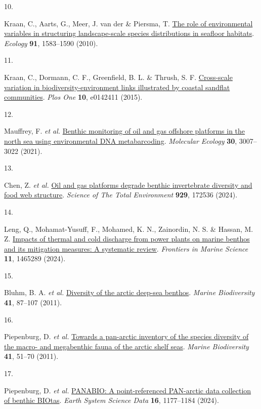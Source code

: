 \documentclass[
  letterpaper,
  DIV=11,
  numbers=noendperiod]{scrartcl}
\newlength{\cslhangindent}
\newlength{\csllabelwidth}
\newenvironment{CSLReferences}[2] %
 {\begin{list}{}{%
  \setlength{\itemindent}{0pt}
  \setlength{\leftmargin}{0pt}
  \setlength{\parsep}{0pt}
  \ifodd #1
   \setlength{\leftmargin}{\cslhangindent}
   \setlength{\itemindent}{-1\cslhangindent}
  \fi
  \setlength{\itemsep}{#2\baselineskip}}}
 {\end{list}}
\newcommand{\CSLLeftMargin}[1]{\parbox[t]{\csllabelwidth}{\strut#1\strut}}
\newcommand{\CSLRightInline}[1]{\parbox[t]{\linewidth - \csllabelwidth}{\strut#1\strut}}
\begin{document}
\begin{CSLReferences}{0}{0}
\CSLLeftMargin{10. }%
\CSLRightInline{Kraan, C., Aarts, G., Meer, J. van der \& Piersma, T.
\href{https://doi.org/10.1890/09-2040.1}{The role of environmental
variables in structuring landscape-scale species distributions in
seafloor habitats}. \emph{Ecology} \textbf{91}, 1583--1590 (2010).}

\CSLLeftMargin{11. }%
\CSLRightInline{Kraan, C., Dormann, C. F., Greenfield, B. L. \& Thrush,
S. F. \href{https://doi.org/10.1371/journal.pone.0142411}{Cross-scale
variation in biodiversity-environment links illustrated by coastal
sandflat communities}. \emph{Plos One} \textbf{10}, e0142411 (2015).}

\CSLLeftMargin{12. }%
\CSLRightInline{Mauffrey, F. \emph{et al.}
\href{https://doi.org/10.1111/mec.15698}{Benthic monitoring of oil and
gas offshore platforms in the north sea using environmental DNA
metabarcoding}. \emph{Molecular Ecology} \textbf{30}, 3007--3022
(2021).}

\CSLLeftMargin{13. }%
\CSLRightInline{Chen, Z. \emph{et al.}
\href{https://doi.org/10.1016/j.scitotenv.2024.172536}{Oil and gas
platforms degrade benthic invertebrate diversity and food web
structure}. \emph{Science of The Total Environment} \textbf{929}, 172536
(2024).}

\CSLLeftMargin{14. }%
\CSLRightInline{Leng, Q., Mohamat-Yusuff, F., Mohamed, K. N., Zainordin,
N. S. \& Hassan, M. Z.
\href{https://doi.org/10.3389/fmars.2024.1465289}{Impacts of thermal and
cold discharge from power plants on marine benthos and its mitigation
measures: A systematic review}. \emph{Frontiers in Marine Science}
\textbf{11}, 1465289 (2024).}

\CSLLeftMargin{15. }%
\CSLRightInline{Bluhm, B. A. \emph{et al.}
\href{https://doi.org/10.1007/s12526-010-0078-4}{Diversity of the arctic
deep-sea benthos}. \emph{Marine Biodiversity} \textbf{41}, 87--107
(2011).}

\CSLLeftMargin{16. }%
\CSLRightInline{Piepenburg, D. \emph{et al.}
\href{https://doi.org/10.1007/s12526-010-0059-7}{Towards a pan-arctic
inventory of the species diversity of the macro- and megabenthic fauna
of the arctic shelf seas}. \emph{Marine Biodiversity} \textbf{41},
51--70 (2011).}

\CSLLeftMargin{17. }%
\CSLRightInline{Piepenburg, D. \emph{et al.}
\href{https://doi.org/10.5194/essd-16-1177-2024}{PANABIO: A
point-referenced PAN-arctic data collection of benthic BIOtas}.
\emph{Earth System Science Data} \textbf{16}, 1177--1184 (2024).}


\end{CSLReferences}
\end{document}
